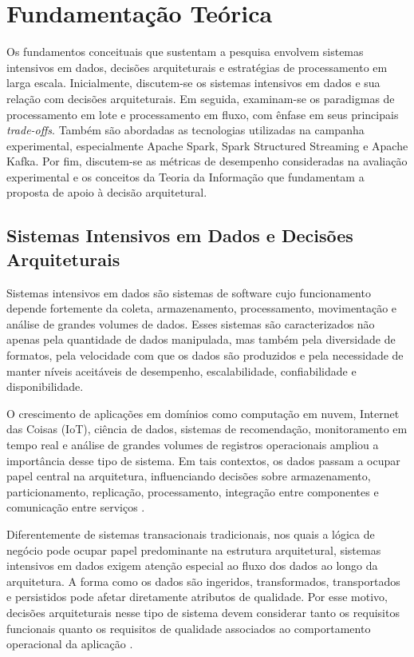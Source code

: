 \chapter{Fundamentação Teórica}
\label{cap:fundamentacao}

Os fundamentos conceituais que sustentam a pesquisa envolvem sistemas intensivos em dados, decisões arquiteturais e estratégias de processamento em larga escala. Inicialmente, discutem-se os sistemas intensivos em dados e sua relação com decisões arquiteturais. Em seguida, examinam-se os paradigmas de processamento em lote e processamento em fluxo, com ênfase em seus principais \textit{trade-offs}. Também são abordadas as tecnologias utilizadas na campanha experimental, especialmente Apache Spark, Spark Structured Streaming e Apache Kafka. Por fim, discutem-se as métricas de desempenho consideradas na avaliação experimental e os conceitos da Teoria da Informação que fundamentam a proposta de apoio à decisão arquitetural.

\section{Sistemas Intensivos em Dados e Decisões Arquiteturais}
\label{sec:sistemas-decisoes}

Sistemas intensivos em dados são sistemas de software cujo funcionamento depende fortemente da coleta, armazenamento, processamento, movimentação e análise de grandes volumes de dados. Esses sistemas são caracterizados não apenas pela quantidade de dados manipulada, mas também pela diversidade de formatos, pela velocidade com que os dados são produzidos e pela necessidade de manter níveis aceitáveis de desempenho, escalabilidade, confiabilidade e disponibilidade.

O crescimento de aplicações em domínios como computação em nuvem, Internet das Coisas (IoT), ciência de dados, sistemas de recomendação, monitoramento em tempo real e análise de grandes volumes de registros operacionais ampliou a importância desse tipo de sistema. Em tais contextos, os dados passam a ocupar papel central na arquitetura, influenciando decisões sobre armazenamento, particionamento, replicação, processamento, integração entre componentes e comunicação entre serviços \cite{dai2019big,hilbert2016big,kleppmann2017designing}.

Diferentemente de sistemas transacionais tradicionais, nos quais a lógica de negócio pode ocupar papel predominante na estrutura arquitetural, sistemas intensivos em dados exigem atenção especial ao fluxo dos dados ao longo da arquitetura. A forma como os dados são ingeridos, transformados, transportados e persistidos pode afetar diretamente atributos de qualidade. Por esse motivo, decisões arquiteturais nesse tipo de sistema devem considerar tanto os requisitos funcionais quanto os requisitos de qualidade associados ao comportamento operacional da aplicação \cite{mattmann2004software,ji2020quality}.

